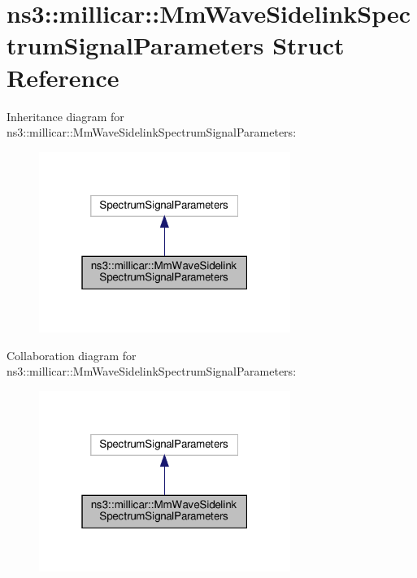 \hypertarget{structns3_1_1millicar_1_1MmWaveSidelinkSpectrumSignalParameters}{}\section{ns3\+:\+:millicar\+:\+:Mm\+Wave\+Sidelink\+Spectrum\+Signal\+Parameters Struct Reference}
\label{structns3_1_1millicar_1_1MmWaveSidelinkSpectrumSignalParameters}


Inheritance diagram for ns3\+:\+:millicar\+:\+:Mm\+Wave\+Sidelink\+Spectrum\+Signal\+Parameters\+:
\nopagebreak
\begin{figure}[H]
\begin{center}
\leavevmode
\includegraphics[width=232pt]{structns3_1_1millicar_1_1MmWaveSidelinkSpectrumSignalParameters__inherit__graph}
\end{center}
\end{figure}


Collaboration diagram for ns3\+:\+:millicar\+:\+:Mm\+Wave\+Sidelink\+Spectrum\+Signal\+Parameters\+:
\nopagebreak
\begin{figure}[H]
\begin{center}
\leavevmode
\includegraphics[width=232pt]{structns3_1_1millicar_1_1MmWaveSidelinkSpectrumSignalParameters__coll__graph}
\end{center}
\end{figure}
